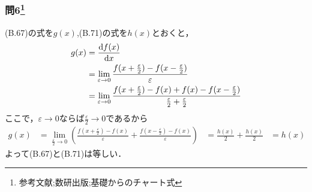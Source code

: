 \documentclass[dvipdfmx,uplatex]{jsarticle}
\begin{document}
\subsubsection{問6\footnote{参考文献;数研出版;基礎からのチャート式}}
(B.67)の式を$g(x)$,(B.71)の式を$h(x)$とおくと，
\begin{align*}
	g(x) &= \frac{\mathrm{d} f(x)}{\mathrm{d} x} \\
	&= \lim_{\varepsilon \rightarrow 0} \frac{f(x+\frac{\varepsilon}{2})-f(x- \frac{\varepsilon}{2})}{\varepsilon} \\
	&= \lim_{\varepsilon \rightarrow 0} \frac{f(x+\frac{\varepsilon}{2})-f(x)+f(x)-f(x- \frac{\varepsilon}{2})}{\frac{\varepsilon}{2}+\frac{\varepsilon}{2}}
\end{align*}
ここで，$\varepsilon \rightarrow 0$ならば$\frac{\varepsilon}{2} \rightarrow 0$であるから
\begin{align*}
	g(x) &= \lim_{\frac{\varepsilon}{2} \rightarrow 0} \left( \frac{f(x+\frac{\varepsilon}{2})-f(x)}{\varepsilon} + \frac{f(x-\frac{\varepsilon}{2})-f(x)}{\varepsilon} \right)
	&= \frac{h(x)}{2} + \frac{h(x)}{2}
	&= h(x)
\end{align*}
よって(B.67)と(B.71)は等しい．
\end{document}
